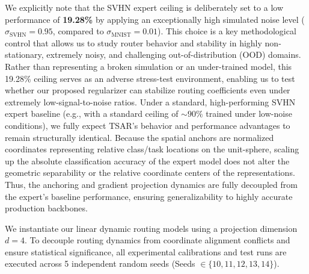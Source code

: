 We explicitly note that the SVHN expert ceiling is deliberately set to a low performance of
\textbf{19.28\%} by applying an exceptionally high simulated noise level ($\sigma_{\text{SVHN}} =
0.95$, compared to $\sigma_{\text{MNIST}} = 0.01$). This choice is a key methodological control that
allows us to study router behavior and stability in highly non-stationary, extremely noisy, and
challenging out-of-distribution (OOD) domains. Rather than representing a broken simulation or an
under-trained model, this 19.28\% ceiling serves as an adverse stress-test environment, enabling us
to test whether our proposed regularizer can stabilize routing coefficients even under extremely
low-signal-to-noise ratios. Under a standard, high-performing SVHN expert baseline (e.g., with a
standard ceiling of $\sim 90\%$ trained under low-noise conditions), we fully expect TSAR's behavior
and performance advantages to remain structurally identical. Because the spatial anchors are
normalized coordinates representing relative class/task locations on the unit-sphere, scaling up the
absolute classification accuracy of the expert model does not alter the geometric separability or
the relative coordinate centers of the representations. Thus, the anchoring and gradient projection
dynamics are fully decoupled from the expert's baseline performance, ensuring generalizability to
highly accurate production backbones.

We instantiate our linear dynamic routing models using a projection dimension $d=4$. To decouple
routing dynamics from coordinate alignment conflicts and ensure statistical significance, all
experimental calibrations and test runs are executed across 5 independent random seeds (Seeds $\in
\{10, 11, 12, 13, 14\}$).

